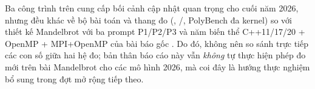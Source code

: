 Ba công trình trên cung cấp bối cảnh cập nhật quan trọng cho cuối năm 2026, nhưng
đều khác về bộ bài toán và thang đo (, /,
PolyBench đa kernel) so với thiết kế Mandelbrot với ba prompt P1/P2/P3 và năm biến
thể C++11/17/20 + OpenMP + MPI+OpenMP của bài báo gốc \cite{diehl2026}. Do đó,
không nên so sánh trực tiếp các con số giữa hai hệ đo; bản thân báo cáo này vẫn
\emph{không} tự thực hiện phép đo mới trên bài Mandelbrot cho các mô hình 2026,
mà coi đây là hướng thực nghiệm bổ sung trong đợt mở rộng tiếp theo.
